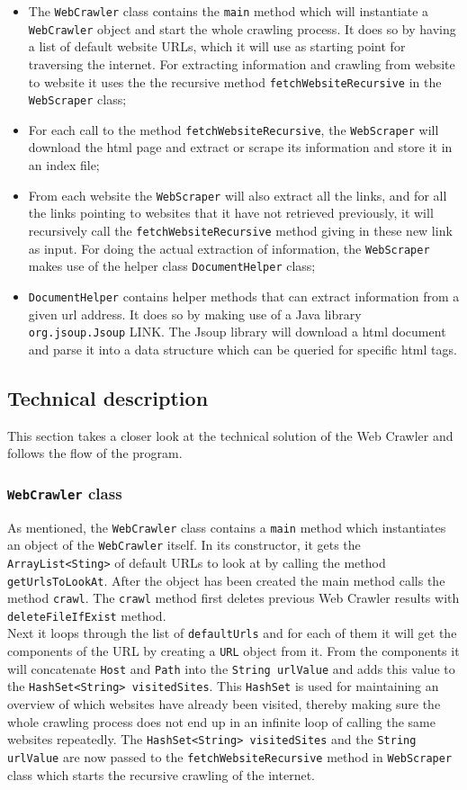 \begin{itemize}
    \item The {\tt WebCrawler} class contains the {\tt main} method which will instantiate a {\tt WebCrawler} object and start the whole crawling process. It does so by having a list of default website URLs, which it will use as starting point for traversing the internet. For extracting information and crawling from website to website it uses the the recursive method {\tt fetchWebsiteRecursive} in the {\tt WebScraper} class;
    \item For each call to the method {\tt fetchWebsiteRecursive}, the {\tt WebScraper} will download the html page and extract or scrape its information and store it in an index file;
    \item From each website the {\tt WebScraper} will also extract all the links, and for all the links pointing to websites that it have not retrieved previously, it will recursively call the {\tt fetchWebsiteRecursive} method giving in these new link as input. For doing the actual extraction of  information, the {\tt WebScraper} makes use of the helper class {\tt DocumentHelper} class;
    \item {\tt DocumentHelper} contains helper methods that can extract information from a given url address. It does so by making use of a Java library {\tt org.jsoup.Jsoup} LINK. The Jsoup library will download a html document and parse it into a data structure which can be queried for specific html tags.
\end{itemize}

\subsection{Technical description}
This section takes a closer look at the technical solution of the Web Crawler and follows the flow of the program.
\subsubsection{{\tt WebCrawler} class}
As mentioned, the {\tt WebCrawler} class contains a {\tt main} method which instantiates an object of the {\tt WebCrawler} itself. In its constructor, it gets the {\tt ArrayList<Sting>} of default URLs to look at by calling the method {\tt getUrlsToLookAt}. After the object has been created the main method calls the method {\tt crawl}. The {\tt crawl} method first deletes previous Web Crawler results with {\tt deleteFileIfExist} method.\\
Next it loops through the list of {\tt defaultUrls} and for each of them it will get the components of the URL by creating a {\tt URL} object from it. From the components it will concatenate {\tt Host} and {\tt Path} into the {\tt String urlValue} and adds this value to the {\tt HashSet<String> visitedSites}. This {\tt HashSet} is used for maintaining an overview of which websites have already been visited, thereby making sure the whole crawling process does not end up in an infinite loop of calling the same websites repeatedly. The {\tt HashSet<String> visitedSites} and the {\tt String urlValue} are now passed to the {\tt fetchWebsiteRecursive} method in {\tt WebScraper} class which starts the recursive crawling of the internet.
